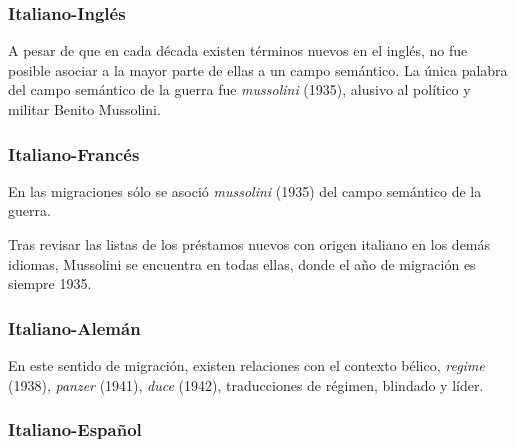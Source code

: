  



\subsubsection*{Italiano-Inglés}%

A pesar de que en cada década existen términos nuevos en el inglés, no fue posible asociar a la mayor parte de ellas a un campo semántico.  La única palabra del campo semántico de la guerra fue  \textit{mussolini} (1935),  alusivo al político y militar Benito Mussolini.


\subsubsection*{Italiano-Francés}%



En las migraciones sólo se asoció \textit{mussolini} (1935) del campo semántico de la guerra.  

Tras revisar las listas de los préstamos nuevos con origen italiano  en los demás idiomas, Mussolini se encuentra en todas ellas, donde el año de migración es siempre 1935.





\subsubsection*{Italiano-Alemán}%

En este sentido de migración,  existen relaciones con el contexto bélico,  \textit{regime} (1938), \textit{panzer} (1941), \textit{duce} (1942),  traducciones de régimen, blindado y líder.




\subsubsection*{Italiano-Español}%

